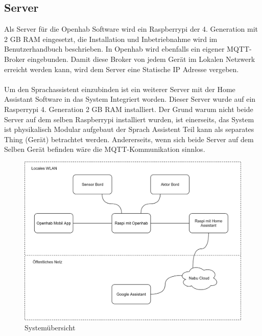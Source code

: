 \subsection{Server}\label{subsec: Server}
Als Server für die Openhab Software wird ein Raspberrypi der 4. Generation mit 2 GB RAM eingesetzt, die Installation und Inbetriebnahme wird im Benutzerhandbuch beschrieben. In Openhab wird ebenfalls ein eigener MQTT-Broker eingebunden. Damit diese Broker von jedem Gerät im Lokalen Netzwerk erreicht werden kann, wird dem Server eine Statische IP Adresse vergeben.\\
\\
Um den Sprachassistent einzubinden ist ein weiterer Server mit der Home Assistant Software in das System Integriert worden. Dieser Server wurde auf ein Rasperrypi 4. Generation 2 GB RAM installiert. Der Grund warum nicht beide Server auf dem selben Raspberrypi installiert wurden, ist einerseits, das System ist physikalisch Modular aufgebaut der Sprach Assistent Teil kann als separates Thing (Gerät) betrachtet werden. Andererseits, wenn sich beide Server auf dem Selben Gerät befinden wäre die MQTT-Kommunikation sinnlos.  



\begin{figure}[H]
	\centering
	\includegraphics[width=\textwidth]{graphics/Systemubersicht.png}
	\caption{Systemübersicht}
	\label{pic: Systemübersicht}
\end{figure}   


